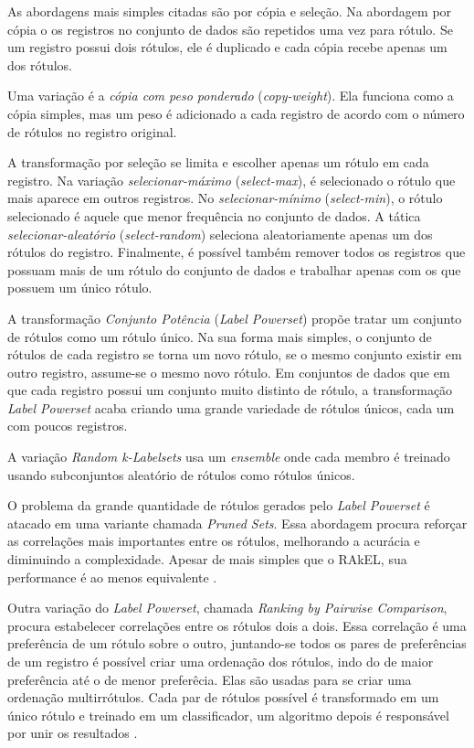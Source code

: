 \documentclass[runningheads,a4paper]{llncs}
\begin{document}
As abordagens mais simples citadas são por cópia e seleção. Na abordagem por cópia o os registros no conjunto de dados são repetidos uma vez para rótulo. Se um registro possui dois rótulos, ele é duplicado e cada cópia recebe apenas um dos rótulos.

Uma variação é a \emph{cópia com peso ponderado} (\textit{copy-weight}). Ela funciona como a cópia simples, mas um peso é adicionado a cada registro de acordo com o número de rótulos no registro original.

A transformação por seleção se limita e escolher apenas um rótulo em cada registro. Na variação \emph{selecionar-máximo} (\textit{select-max}), é selecionado o rótulo que mais aparece em outros registros. No \emph{selecionar-mínimo} (\textit{select-min}), o rótulo selecionado é aquele que menor frequência no conjunto de dados. A tática \emph{selecionar-aleatório} (\textit{select-random}) seleciona aleatoriamente apenas um dos rótulos do registro. Finalmente, é possível também remover todos os registros que possuam mais de um rótulo do conjunto de dados e trabalhar apenas com os que possuem um único rótulo.

A transformação \emph{Conjunto Potência} (\textit{Label Powerset}) propõe tratar um conjunto de rótulos como um rótulo único. Na sua forma mais simples, o conjunto de rótulos de cada registro se torna um novo rótulo, se o mesmo conjunto existir em outro registro, assume-se o mesmo novo rótulo.
Em conjuntos de dados que em que cada registro possui um conjunto muito distinto de rótulo, a transformação \textit{Label Powerset} acaba criando uma grande variedade de rótulos únicos, cada um com poucos registros.

A variação \emph{Random k-Labelsets} \cite{Tsoumakas2007-wm} usa um \textit{ensemble} onde cada membro é treinado usando subconjuntos aleatório de rótulos como rótulos únicos.

O problema da grande quantidade de rótulos gerados pelo \textit{Label Powerset} é atacado em uma variante chamada \textit{Pruned Sets}. Essa abordagem procura reforçar as correlações mais importantes entre os rótulos, melhorando a acurácia e diminuindo a complexidade. Apesar de mais simples que o RAkEL, sua performance é ao menos equivalente \cite{Read2008-bt}.

Outra variação do \textit{Label Powerset}, chamada \textit{Ranking by Pairwise Comparison}, procura estabelecer correlações entre os rótulos dois a dois. Essa correlação é uma preferência de um rótulo sobre o outro, juntando-se todos os pares de preferências de um registro é possível criar uma ordenação dos rótulos, indo do de maior preferência até o de menor preferêcia. Elas são usadas para se criar uma ordenação multirrótulos. Cada par de rótulos possível é transformado em um único rótulo e treinado em um classificador, um algoritmo depois é responsável por unir os resultados \cite{Hullermeier2008-co}.
\end{document}
